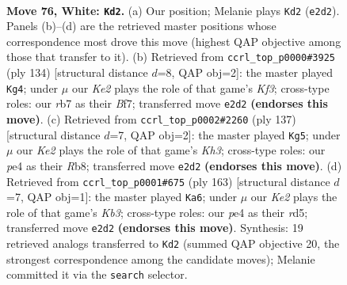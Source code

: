 \documentclass[11pt]{article}
\begin{document}
\clearpage

\begin{figure}[p]\centering
\begin{subfigure}{0.46\textwidth}\centering
\resizebox{\linewidth}{!}{%
\newchessgame
\chessboard[
  setfen={8/1r6/6k1/8/4pp2/6p1/4K3/8 w - - 0 76},
  showmover=false,
  pgfstyle=straightmove, color=movearrow, markmove={e2-d2}
]}
\caption{}
\end{subfigure}\hfill
\begin{subfigure}{0.46\textwidth}\centering
\resizebox{\linewidth}{!}{%
\newchessgame
\chessboard[
  setfen={8/5B2/8/1pk3p1/7p/5K2/8/8 w - - 4 68},
  showmover=false,
  pgfstyle=straightmove, color=movearrow, markmove={f3-g4}
]}
\caption{}
\end{subfigure}
\\[4pt]
\begin{subfigure}{0.46\textwidth}\centering
\resizebox{\linewidth}{!}{%
\newchessgame
\chessboard[
  setfen={1r6/R7/5p1k/5P2/6P1/8/6K1/8 b - - 0 69},
  showmover=false,
  pgfstyle=straightmove, color=movearrow, markmove={h6-g5}
]}
\caption{}
\end{subfigure}\hfill
\begin{subfigure}{0.46\textwidth}\centering
\resizebox{\linewidth}{!}{%
\newchessgame
\chessboard[
  setfen={8/4K3/1k6/3R4/1Pr5/P7/8/8 b - - 54 82},
  showmover=false,
  pgfstyle=straightmove, color=movearrow, markmove={b6-a6}
]}
\caption{}
\end{subfigure}
\caption{\textbf{Move 76, White: \texttt{Kd2}.} (a) Our position; Melanie plays \texttt{Kd2} (\texttt{e2d2}). Panels (b)--(d) are the retrieved master positions whose correspondence most drove this move (highest QAP objective among those that transfer to it). (b) Retrieved from \texttt{ccrl\_top\_p0000\#3925} (ply 134) [structural distance $d$=8, QAP obj=2]: the master played \texttt{Kg4}; under $\mu$ our \emph{Ke2} plays the role of that game's \emph{Kf3}; cross-type roles: our \emph{r}b7 as their \emph{B}f7; transferred move \texttt{e2d2} \textbf{(endorses this move)}. (c) Retrieved from \texttt{ccrl\_top\_p0002\#2260} (ply 137) [structural distance $d$=7, QAP obj=2]: the master played \texttt{Kg5}; under $\mu$ our \emph{Ke2} plays the role of that game's \emph{Kh3}; cross-type roles: our \emph{p}e4 as their \emph{R}b8; transferred move \texttt{e2d2} \textbf{(endorses this move)}. (d) Retrieved from \texttt{ccrl\_top\_p0001\#675} (ply 163) [structural distance $d$=7, QAP obj=1]: the master played \texttt{Ka6}; under $\mu$ our \emph{Ke2} plays the role of that game's \emph{Kb3}; cross-type roles: our \emph{p}e4 as their \emph{r}d5; transferred move \texttt{e2d2} \textbf{(endorses this move)}. Synthesis: 19 retrieved analogs transferred to \texttt{Kd2} (summed QAP objective 20, the strongest correspondence among the candidate moves); Melanie committed it via the \texttt{search} selector.}
\label{fig:thought-m150}
\end{figure}
\end{document}
